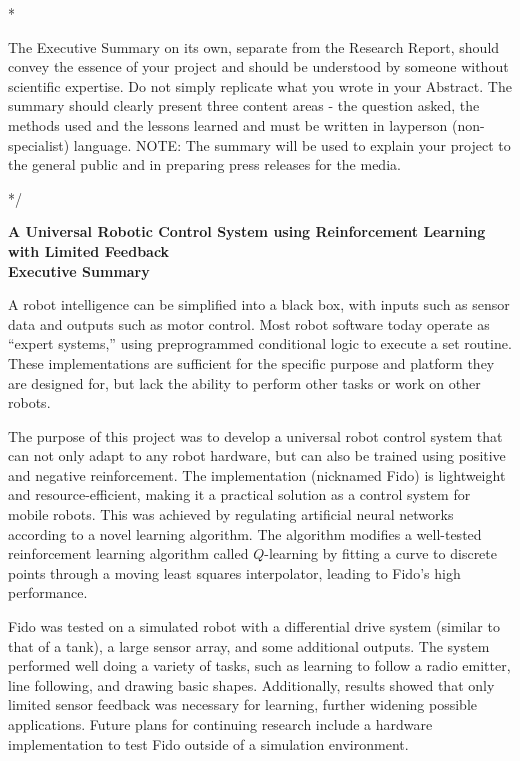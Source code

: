 \documentclass[letterpaper,12pt]{article}
\begin{document}
\/*

The Executive Summary on its own, separate from the Research Report, should convey the essence of your project and should be understood by someone without scientific expertise. Do not simply replicate what you wrote in your Abstract. The summary should clearly present three content areas - the question asked, the methods used and the lessons learned and must be written in layperson (non-specialist) language. NOTE: The summary will be used to explain your project to the general public and in preparing press releases for the media.

*/

\begin{center}
	{\Large
	\textbf{A Universal Robotic Control System using Reinforcement Learning with Limited Feedback}}\\
	\vspace{1cm}
	{\large \textbf{Executive Summary}}
\end{center}

\noindent

A robot intelligence can be simplified into a black box, with inputs such as sensor data and outputs such as motor control.  Most robot software today operate as ``expert systems,'' using preprogrammed conditional logic to execute a set routine.  These implementations are sufficient for the specific purpose and platform they are designed for, but lack the ability to perform other tasks or work on other robots.

The purpose of this project was to develop a universal robot control system that can not only adapt to any robot hardware, but can also be trained using positive and negative reinforcement.  The implementation (nicknamed Fido) is lightweight and resource-efficient, making it a practical solution as a control system for mobile robots.  This was achieved by regulating artificial neural networks according to a novel learning algorithm.  The algorithm modifies a well-tested reinforcement learning algorithm called $Q$-learning by fitting a curve to discrete points through a moving least squares interpolator, leading to Fido's high performance.

Fido was tested on a simulated robot with a differential drive system (similar to that of a tank), a large sensor array, and some additional outputs.  The system performed well doing a variety of tasks, such as learning to follow a radio emitter, line following, and drawing basic shapes.  Additionally, results showed that only limited sensor feedback was necessary for learning, further widening possible applications.  Future plans for continuing research include a hardware implementation to test Fido outside of a simulation environment.
\end{document}
